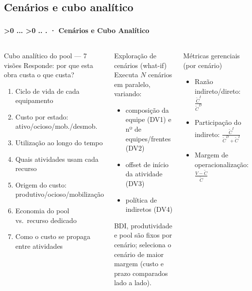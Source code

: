 \documentclass[aspectratio=169,10pt]{beamer}
\newcounter{mlc3}[subsection]
\newcounter{mlc4}[mlc3]
\newcommand{\pathnum}{%
  \ifnum\value{mlc4}>0
    \thesection.\thesubsection.\arabic{mlc3}.\arabic{mlc4}%
  \else\ifnum\value{mlc3}>0
    \thesection.\thesubsection.\arabic{mlc3}%
  \else
    \thesection.\thesubsection%
  \fi\fi
}
\newcommand{\mtitle}[1]{%
  \frametitle{\insertsection}%
  \framesubtitle{\pathnum\;·\; #1}}
\begin{document}
\subsection{Cenários e cubo analítico}
\begin{frame}
  \mtitle{Cenários e Cubo Analítico}
  \begin{columns}[T]
    \begin{block}{Cubo analítico do pool --- 7 visões}
      \scriptsize Responde: por que esta obra custa o que custa?
      \begin{enumerate}\scriptsize
        \item Ciclo de vida de cada equipamento
        \item Custo por estado: ativo/ocioso/mob./desmob.
        \item Utilização ao longo do tempo
        \item Quais atividades usam cada recurso
        \item Origem do custo: produtivo/ocioso/mobilização
        \item Economia do pool vs.\ recurso dedicado
        \item Como o custo se propaga entre atividades
      \end{enumerate}
    \end{block}
    \begin{block}{Exploração de cenários (what-if)}
      \scriptsize Executa $N$ cenários em paralelo, variando:
      \begin{itemize}\scriptsize
        \item composição da equipe (DV1) e nº de equipes/frentes (DV2)
        \item offset de início da atividade (DV3)
        \item política de indiretos (DV4)
      \end{itemize}
      BDI, produtividade e pool são fixos por cenário; seleciona o
      cenário de maior margem (custo e prazo comparados lado a lado).
    \end{block}
    \vspace{4pt}
    \begin{block}{Métricas gerenciais (por cenário)}
      \begin{itemize}\scriptsize
        \item Razão indireto/direto: $\frac{\tilde{C}^I}{\tilde{C}^D}$
        \item Participação do indireto: $\frac{\tilde{C}^I}{\tilde{C}^D+\tilde{C}^I}$
        \item Margem de operacionalização: $\frac{V-\tilde{C}}{\tilde{C}}$
      \end{itemize}
    \end{block}
  \end{columns}
\end{frame}
\end{document}
